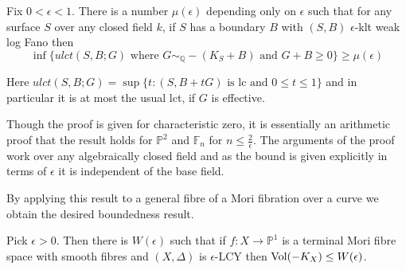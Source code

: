 \begin{theorem}\label{aj}\cite[Theorem 2.8]{jiang2014boundedness}
	Fix $0<\epsilon<1$. There is a number $\mu(\epsilon)$ depending only on $\epsilon$ such that for any surface $S$ over any closed field $k$, if $S$ has a boundary $B$ with $(S,B)$ $\epsilon$-klt weak log Fano then \[\inf \{ulct (S,B;G) \text{ where } G \sim_{\mathbb{Q}}-(K_{S}+B) \text{ and } G+B \geq 0\}\geq \mu(\epsilon)\]
\end{theorem}

Here $ulct (S,B;G)= \sup\{t\colon  (S,B+tG) \text{ is lc and } 0 \leq t \leq 1\}$ and in particular it is at most the usual lct, if $G$ is effective.

Though the proof is given for characteristic zero, it is essentially an arithmetic proof that the result holds for $\mathbb{P}^{2}$ and $\mathbb{F}_{n}$ for $n \leq \frac{2}{\epsilon}$. The arguments of the proof work over any algebraically closed field and as the bound is given explicitly in terms of $\epsilon$ it is independent of the base field.

By applying this result to a general fibre of a Mori fibration over a curve we obtain the desired boundedness result.

\begin{theorem}\label{J2}
	Pick $\epsilon>0$. Then there is $W(\epsilon)$ such that if $f\colon X \to \mathbb{P}^{1}$ is a terminal Mori fibre space with smooth fibres and $(X,\Delta)$ is $\epsilon$-LCY then $\text{Vol}(-K_{X})\leq W(\epsilon)$.
\end{theorem}

